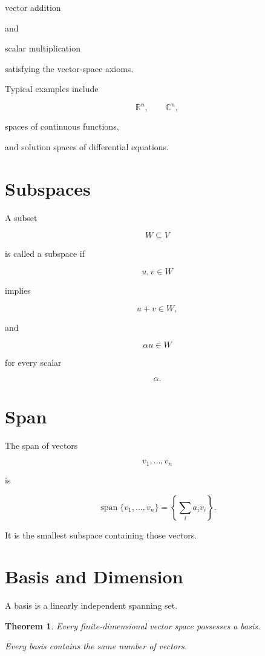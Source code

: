 \documentclass[11pt,fleqn]{book}
\numberwithin{equation}{chapter}
\theoremstyle{plain}
\newtheorem{theorem}{Theorem}[chapter]
\theoremstyle{definition}
\theoremstyle{remark}
\begin{document}
vector addition

and

scalar multiplication

satisfying the vector-space axioms.

Typical examples include

\[
\mathbb R^n,
\qquad
\mathbb C^n,
\]

spaces of continuous functions,

and solution spaces of differential equations.


\section{Subspaces}

A subset

\[
W\subseteq V
\]

is called a subspace if

\[
u,v\in W
\]

implies

\[
u+v\in W,
\]

and

\[
\alpha u\in W
\]

for every scalar

\[
\alpha.
\]


\section{Span}

The span of vectors

\[
v_1,\ldots,v_n
\]

is

\[
\operatorname{span}
\{v_1,\ldots,v_n\}
=
\left\{
\sum_i
a_i v_i
\right\}.
\]

It is the smallest subspace containing those vectors.


\section{Basis and Dimension}

A basis is a linearly independent spanning set.

\begin{theorem}

Every finite-dimensional vector space possesses a basis.

Every basis contains the same number of vectors.

\end{theorem}
\end{document}
